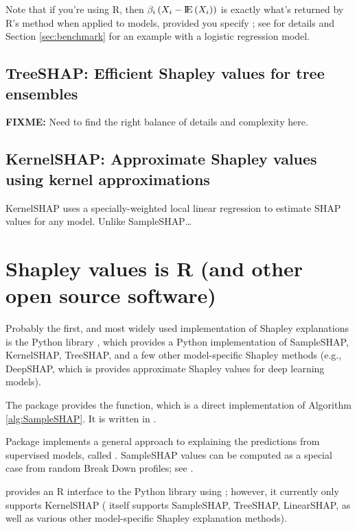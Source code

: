 Note that if you're using R, then
\(\beta_i \left(X_i - \E\left(X_i\right)\right)\) is exactly what's
returned by R's  method when applied to 
models, provided you specify ; see
 for details and Section \ref{sec:benchmark} for an
example with a logistic regression model.

\subsection{TreeSHAP: Efficient Shapley values for tree ensembles}

\textbf{FIXME:} Need to find the right balance of details and complexity
here.

\subsection{KernelSHAP: Approximate Shapley values using kernel approximations}

KernelSHAP \citep{lundberg-2017-KernelSHAP} uses a specially-weighted
local linear regression to estimate SHAP values for any model. Unlike
SampleSHAP\ldots{}

\section{Shapley values is R (and other open source software)}

Probably the first, and most widely used implementation of Shapley
explanations is the Python  library
\citep{lundberg-2017-KernelSHAP}, which provides a Python implementation
of SampleSHAP, KernelSHAP, TreeSHAP, and a few other model-specific
Shapley methods (e.g., DeepSHAP, which is provides approximate Shapley
values for deep learning models).

The  package \citep{R-iml} provides the 
function, which is a direct implementation of Algorithm
\ref{alg:SampleSHAP}. It is written in  \citep{R-R6}.

Package  implements a general approach to explaining
the predictions from supervised models, called 
\citep{gosiewska-2019-iBreakDown}. SampleSHAP values can be computed as
a special case from random Break Down profiles; see
.

 provides an R interface to the Python 
library using  \citep{R-reticulate}; however, it
currently only supports KernelSHAP ( itself supports
SampleSHAP, TreeSHAP, LinearSHAP, as well as various other
model-specific Shapley explanation methods).

